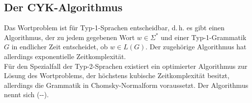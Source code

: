 \pagebreak

\subsection{%
    Der CYK-Algorithmus%
}

\begin{Bem}
    Das Wortproblem ist für Typ-1-Sprachen entscheidbar, d.\,h.
    es gibt einen Algorithmus, der zu jedem gegebenen Wort $w \in \Sigma^\ast$
    und einer Typ-1-Grammatik $G$ in endlicher Zeit entscheidet, ob
    $w \in L(G)$.
    Der zugehörige Algorithmus hat allerdings exponentielle Zeitkomplexität.\\
    Für den Spezialfall der Typ-2-Sprachen existiert ein optimierter
    Algorithmus zur Lösung des Wortproblems, der höchstens kubische
    Zeitkomplexität besitzt, allerdings die Grammatik in Chomsky-Normalform
    voraussetzt.
    Der Algorithmus nennt sich 
    (--).
\end{Bem}

\linie

